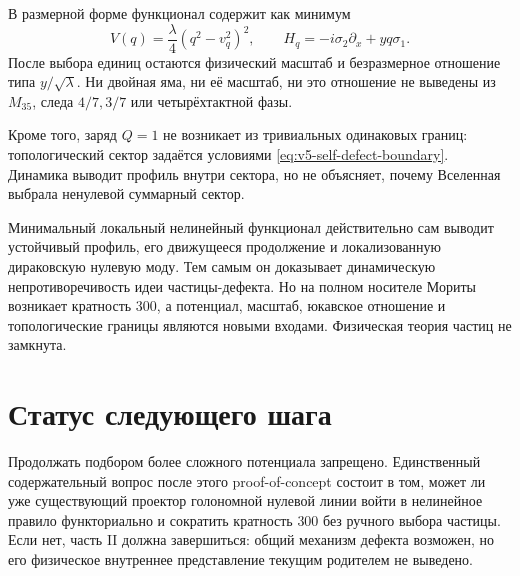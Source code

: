 В размерной форме функционал содержит как минимум
\begin{equation}
 V(q)=\frac\lambda4(q^2-v_q^2)^2,
 \qquad
 H_q=-i\sigma_2\partial_x+yq\sigma_1.
 \label{eq:v5-self-defect-dimensional-data}
\end{equation}
После выбора единиц остаются физический масштаб и безразмерное отношение
типа $y/\sqrt\lambda$. Ни двойная яма, ни её масштаб, ни это отношение не
выведены из $M_{35}$, следа $4/7,3/7$ или четырёхтактной фазы.

Кроме того, заряд $Q=1$ не возникает из тривиальных одинаковых границ:
топологический сектор задаётся условиями
\eqref{eq:v5-self-defect-boundary}. Динамика выводит профиль внутри сектора,
но не объясняет, почему Вселенная выбрала ненулевой суммарный сектор.

\begin{theorem}
Минимальный локальный нелинейный функционал действительно сам выводит
устойчивый профиль, его движущееся продолжение и локализованную дираковскую
нулевую моду. Тем самым он доказывает динамическую непротиворечивость идеи
частицы-дефекта. Но на полном носителе Мориты возникает кратность $300$, а
потенциал, масштаб, юкавское отношение и топологические границы являются
новыми входами. Физическая теория частиц не замкнута.
\end{theorem}

\section{Статус следующего шага}

Продолжать подбором более сложного потенциала запрещено. Единственный
содержательный вопрос после этого proof-of-concept состоит в том, может ли
уже существующий проектор голономной нулевой линии войти в нелинейное
правило функториально и сократить кратность $300$ без ручного выбора
частицы. Если нет, часть II должна завершиться: общий механизм дефекта
возможен, но его физическое внутреннее представление текущим родителем не
выведено.

